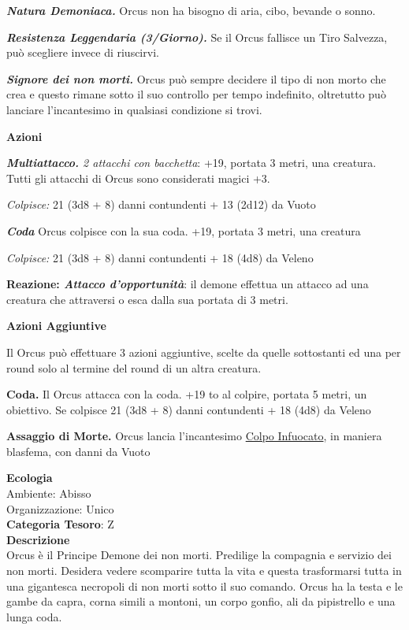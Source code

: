 \begin{multicols}{2}
{\emph{\textbf{Natura Demoniaca.}} Orcus non ha bisogno di aria, cibo, bevande o sonno.

\emph{\textbf{Resistenza Leggendaria (3/Giorno).}} Se il Orcus fallisce un Tiro Salvezza, può scegliere invece di riuscirvi.

\emph{\textbf{Signore dei non morti.}} Orcus può sempre decidere il tipo di non morto che crea e questo rimane sotto il suo controllo per tempo indefinito, oltretutto può lanciare l'incantesimo in qualsiasi condizione si trovi.

\textbf{Azioni}

\emph{\textbf{Multiattacco.} 2 attacchi con bacchetta}: +19, portata 3 metri, una creatura. Tutti gli attacchi di Orcus sono considerati magici +3.

\emph{Colpisce:} 21 (3d8 + 8) danni contundenti + 13 (2d12) da Vuoto

\emph{\textbf{Coda}} Orcus colpisce con la sua coda. +19, portata 3 metri, una creatura

\emph{Colpisce:} 21 (3d8 + 8) danni contundenti + 18 (4d8) da Veleno

\textbf{Reazione: \emph{Attacco d'opportunità}}: il demone effettua un attacco ad una creatura che attraversi o esca dalla sua portata di 3 metri.

\textbf{Azioni Aggiuntive}

Il Orcus può effettuare 3 azioni aggiuntive, scelte da quelle sottostanti ed una per round solo al termine del round di un altra creatura.

\textbf{Coda.} Il Orcus attacca con la coda. +19 to al colpire, portata 5 metri, un obiettivo. Se colpisce 21 (3d8 + 8) danni contundenti + 18 (4d8) da Veleno

\textbf{Assaggio di Morte.} Orcus lancia l'incantesimo \hyperlink{Colpo Infuocato}{Colpo Infuocato}, in maniera blasfema, con danni da Vuoto

\textbf{Ecologia}\\
Ambiente: Abisso\\
Organizzazione: Unico\\
\textbf{Categoria Tesoro}: Z\\
\textbf{Descrizione}\\
Orcus è il Principe Demone dei non morti. Predilige la compagnia e servizio dei non morti. Desidera vedere scomparire tutta la vita e questa trasformarsi tutta in una gigantesca necropoli di non morti sotto il suo comando. Orcus ha la testa e le gambe da capra, corna simili a montoni, un corpo gonfio, ali da pipistrello e una lunga coda.

}
\end{multicols}
